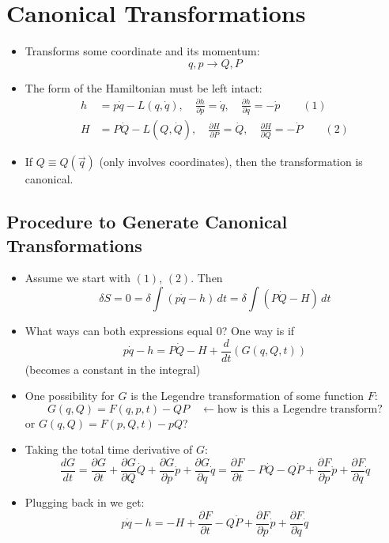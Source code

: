 
\chapter{Canonical Transformations}

\begin{itemize}
    \item Transforms some coordinate and its momentum:
    \[
        q, p \to Q, P
    \]
    \item The form of the Hamiltonian must be left intact:
    \begin{align*}
        h &= p\dot{q} - L(q,\dot{q}), \quad \frac{\partial h}{\partial p} = \dot{q},\quad \frac{\partial h}{\partial q} = -\dot{p} \qquad (1)\\
        H &= P\dot{Q} - L(Q,\dot{Q}), \quad \frac{\partial H}{\partial P} = \dot{Q},\quad \frac{\partial H}{\partial Q} = -\dot{P} \qquad (2)
    \end{align*}
    \item If $Q \equiv Q(\vec{q})$ (only involves coordinates), then the transformation is canonical.
\end{itemize}

\section{Procedure to Generate Canonical Transformations}

\begin{itemize}
    \item Assume we start with $(1)$, $(2)$. Then
    \[
        \delta S = 0 = \delta\int(p\dot{q} - h)\,dt = \delta\int(P\dot{Q} - H)\,dt
    \]
    \item What ways can both expressions equal 0? One way is if
    \[
        p\dot{q} - h = P\dot{Q} - H + \frac{d}{dt}\!\left(G(q,Q,t)\right)
    \]
    (becomes a constant in the integral)
    \item One possibility for $G$ is the Legendre transformation of some function $F$:
    \[
        G(q,Q) = F(q,p,t) - QP \quad \leftarrow \text{how is this a Legendre transform?}
    \]
    or $G(q,Q) = F(p,Q,t) - pQ$?
    \item Taking the total time derivative of $G$:
    \[
        \frac{dG}{dt} = \frac{\partial G}{\partial t} + \frac{\partial G}{\partial Q}\dot{Q} + \frac{\partial G}{\partial p}\dot{p} + \frac{\partial G}{\partial q}\dot{q} = \frac{\partial F}{\partial t} - P\dot{Q} - Q\dot{P} + \frac{\partial F}{\partial p}\dot{p} + \frac{\partial F}{\partial q}\dot{q}
    \]
    \item Plugging back in we get:
    \[
        p\dot{q} - h = -H + \frac{\partial F}{\partial t} - Q\dot{P} + \frac{\partial F}{\partial p}\dot{p} + \frac{\partial F}{\partial q}\dot{q}
    \]
\end{itemize}

